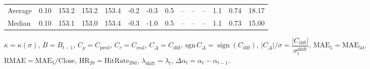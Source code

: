 \begin{threeparttable}
{\begin{tabular}{lrrrrrrrrrrrrr}
Average &     0.10 & 153.2 & 153.2 & 153.4 &       -0.2 &                     -0.3 &                 0.5 &         -- &        -- &             -- &              1.1 &            0.74 &                  18.17 \\
 Median &     0.10 & 153.1 & 153.0 & 153.4 &       -0.3 &                     -1.0 &                 0.5 &         -- &        -- &             -- &              1.1 &            0.73 &                  15.00 \\
\bottomrule
\end{tabular}
}
\begin{tablenotes}\footnotesize
\item $\kappa=\kappa(\sigma)$, $B=B_{t-1}$, $C_p=C_{\text{pred}}$, $C_r=C_{\text{real}}$, $C_\Delta=C_{\text{diff}}$, $\mathrm{sgn}\,C_\Delta=\operatorname{sign}(C_{\text{diff}})$, $|C_\Delta|/\sigma=\dfrac{|C_{\text{diff}}|}{\sigma_t^{\text{shift}}}$, $\mathrm{MAE}_5=\mathrm{MAE}_{5\text{d}}$, $\mathrm{RMAE}= \mathrm{MAE}_5 / \text{Close}$, $\mathrm{HR}_{20}=\mathrm{HitRate}_{20\text{d}}$, 
$\lambda_{\text{shift}}=\lambda_t$, 
$\Delta\alpha_t=\alpha_t-\alpha_{t-1}$.
\end{tablenotes}
\end{threeparttable}
\endgroup

